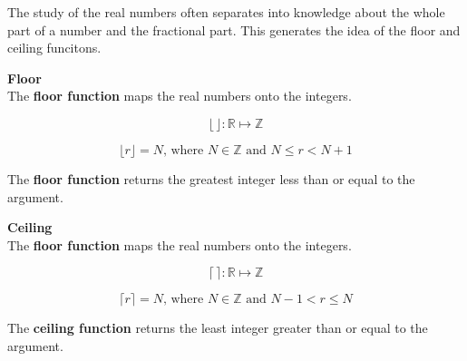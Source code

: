 \documentclass{ximera}
\author{Alan Yang}
\begin{document}
The study of the real numbers often separates into knowledge about the whole part of a number and the fractional part.  This generates the idea of the floor and ceiling funcitons.





\begin{definition}  \textbf{\textcolor{green!50!black}{Floor}} \\

The \textbf{floor function} maps the real numbers onto the integers.

\[
\lfloor \, \rfloor : \mathbb{R} \mapsto \mathbb{Z}
\]


\[
\lfloor r \rfloor = N \text{, where } N \in \mathbb{Z} \text{ and } N \leq r < N+1  
\]


The \textbf{floor function} returns the greatest integer less than or equal to the argument.

\end{definition}








\begin{definition}  \textbf{\textcolor{green!50!black}{Ceiling}} \\

The \textbf{floor function} maps the real numbers onto the integers.

\[
\lceil \, \rceil : \mathbb{R} \mapsto \mathbb{Z}
\]


\[
\lceil r \rceil = N \text{, where } N \in \mathbb{Z} \text{ and } N-1 < r \leq N  
\]


The \textbf{ceiling function} returns the least integer greater than or equal to the argument.

\end{definition}
\end{document}
